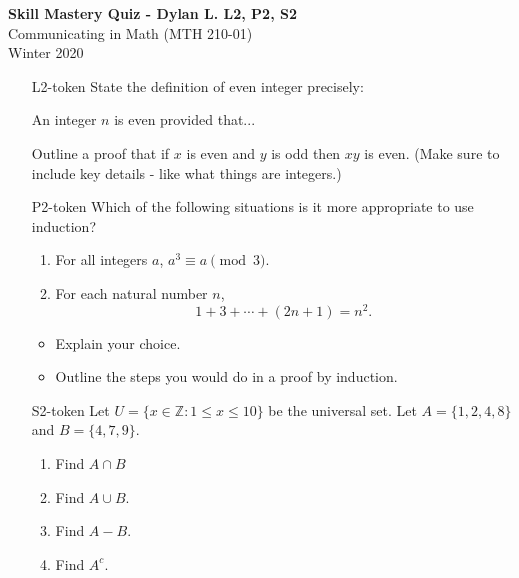 \documentclass[10pt]{article}
\newcommand{\Z}{\mathbb{Z}}
\begin{document}
\vspace{-1.2in}
\begin{center} \textbf{\Large{Skill Mastery Quiz - Dylan L. L2, P2, S2}} \\
Communicating in Math (MTH 210-01)\\
Winter 2020
\end{center}






\begin{itemize}
	
\item[L2-token] State the definition of even integer precisely:

An integer $n$ is even provided that...



\vfill
Outline a proof that if $x$ is even and $y$ is odd then $xy$ is even. (Make sure to include key details - like what things are integers.)
 

\vfill
\vfill
\vfill
\vfill

\newpage

\item[P2-token] 	Which of the following situations is it more appropriate to use induction?
\begin{enumerate}
\item For all integers $a$, $a^3 \equiv a \pmod{3}$.
\item For each natural number $n$, 
$$1+3+\cdots + (2n+1)  =n^2.$$
\end{enumerate}

\begin{itemize}
\item Explain your choice.
\vspace{.75in}

\item Outline the steps you would do in a proof by induction.
\vspace{.5in}
\end{itemize}

\vfill

\item[S2-token] Let $U = \{x\in\Z: 1\leq x\leq 10\}$ be the universal set. Let $A = \{1,2,4,8\}$ and $B = \{4,7,9\}$.
	\begin{enumerate}
	\item Find $A\cap B$
	\vspace{.4in}
	\item Find $A\cup B$.
	\vspace{.4in}
	\item Find $A-B$.
	\vspace{.4in}
	\item Find $A^c$.
	\vspace{.4in}
	\end{enumerate}
\end{itemize}
	
\end{document}
